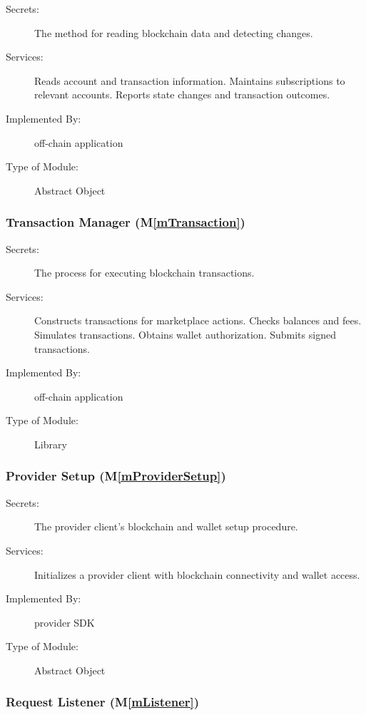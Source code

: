 \documentclass[12pt, titlepage]{article}
\newcommand{\mref}[1]{M\ref{#1}}
\begin{document}
\begin{description}
\item[Secrets:] The method for reading blockchain data and detecting changes.
\item[Services:] Reads account and transaction information. Maintains
  subscriptions to relevant accounts. Reports state changes and transaction
  outcomes.
\item[Implemented By:] \progname{} off-chain application
\item[Type of Module:] Abstract Object
\end{description}

\subsubsection{Transaction Manager (\mref{mTransaction})}

\begin{description}
\item[Secrets:] The process for executing blockchain transactions.
\item[Services:] Constructs transactions for marketplace actions. Checks
  balances and fees. Simulates transactions. Obtains wallet authorization.
  Submits signed transactions.
\item[Implemented By:] \progname{} off-chain application
\item[Type of Module:] Library
\end{description}

\subsubsection{Provider Setup (\mref{mProviderSetup})}

\begin{description}
\item[Secrets:] The provider client's blockchain and wallet setup procedure.
\item[Services:] Initializes a provider client with blockchain connectivity
  and wallet access.
\item[Implemented By:] \progname{} provider SDK
\item[Type of Module:] Abstract Object
\end{description}

\subsubsection{Request Listener (\mref{mListener})}
\end{document}

